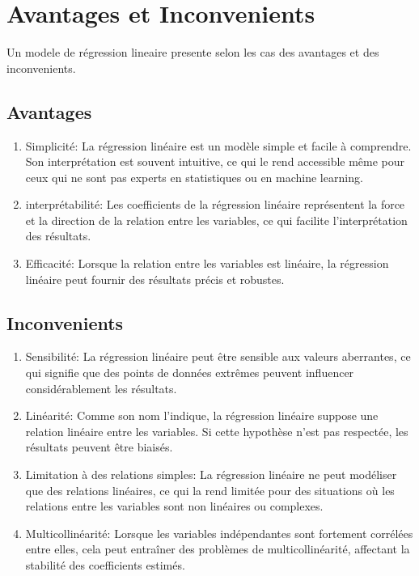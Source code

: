 \documentclass[a0,portrait]{a0poster}
\begin{document}
\section*{Avantages et Inconvenients}

Un modele de régression lineaire presente selon les cas des avantages et des inconvenients.

\subsection*{Avantages}

\begin{enumerate}
    \item Simplicité: La régression linéaire est un modèle simple et facile à comprendre. Son interprétation est souvent intuitive, ce qui le rend accessible même pour ceux qui ne sont pas experts en statistiques ou en machine learning.
    \item interprétabilité: Les coefficients de la régression linéaire représentent la force et la direction de la relation entre les variables, ce qui facilite l'interprétation des résultats.
    \item Efficacité: Lorsque la relation entre les variables est linéaire, la régression linéaire peut fournir des résultats précis et robustes.
\end{enumerate}

\subsection*{Inconvenients}

\begin{enumerate}
    \item Sensibilité: La régression linéaire peut être sensible aux valeurs aberrantes, ce qui signifie que des points de données extrêmes peuvent influencer considérablement les résultats.
    \item Linéarité: Comme son nom l'indique, la régression linéaire suppose une relation linéaire entre les variables. Si cette hypothèse n'est pas respectée, les résultats peuvent être biaisés.
    \item Limitation à des relations simples:  La régression linéaire ne peut modéliser que des relations linéaires, ce qui la rend limitée pour des situations où les relations entre les variables sont non linéaires ou complexes.
    \item Multicollinéarité: Lorsque les variables indépendantes sont fortement corrélées entre elles, cela peut entraîner des problèmes de multicollinéarité, affectant la stabilité des coefficients estimés.
\end{enumerate}
\end{document}
